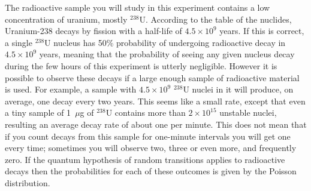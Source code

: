 \documentclass{revtex4}
\begin{document}
The radioactive sample you will study in this experiment contains a low
concentration of uranium, mostly $^{238}$U.  According to the table of
the nuclides, Uranium-238 decays by fission with a half-life of
$4.5\times 10^{9}$ years.  If this is correct, a single $^{238}$U nucleus
has 50\% probability of undergoing radioactive decay in $4.5\times 10^9$
years, meaning that the probability of seeing any given nucleus decay during
the few hours of this experiment is utterly negligible.  However it is
possible to observe these decays if a large enough sample of radioactive
material is used.  For example, a sample with $4.5\times 10^9$ $^{238}$U
nuclei in it will produce, on average, one decay every two years.  This
seems like a small rate, except that even a tiny sample of 1~$\mu$g of
$^{238}$U contains more than $2\times 10^{15}$ unstable nuclei, resulting
an average decay rate of about one per minute.  This does not mean that if
you count decays from this sample for one-minute intervals you will get one
every time; sometimes you will observe two, three or even more, and
frequently zero.  If the quantum hypothesis of random transitions applies
to radioactive decays then the probabilities for each of these outcomes is 
given by the Poisson distribution.
\end{document}
